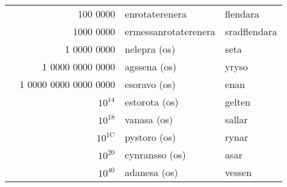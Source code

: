 \begin{center}
\begin{tabular}{|r|r|l|l|}
    & 100 0000 & enrotaterenera & flendara \\
    & 1000 0000 & ermessanrotaterenera & sradflendara \\
    & 1 0000 0000 & nelepra (os) & seta \\
    & 1 0000 0000 0000 & agssena (os) & yryso \\
    & 1 0000 0000 0000 0000 & esoravo (os) & enan \\
    & $10^{14}$ & estorota (os) & gelten \\
    & $10^{18}$ & vanasa (os) & sallar \\
    & $10^{1\text{C}}$ & pystoro (os) & rynar \\
    & $10^{20}$ & cynransso (os) & asar \\
    & $10^{40}$ & adanesa (os) & vessen \\
    \hline
  \end{tabular}
\end{center}